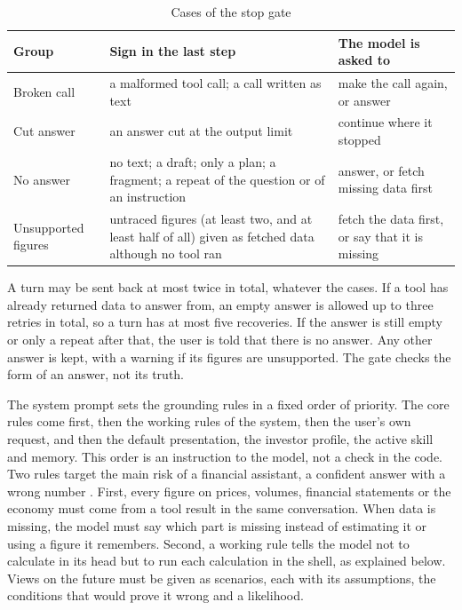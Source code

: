 \begin{table}[H]
  \centering
  \caption{Cases of the stop gate}\label{tab:stop-gate}
  \begin{tabularx}{\textwidth}{@{}l L L@{}}
    \toprule
    {Group} & {Sign in the last step} & {The model is asked to}\\
    \midrule
    Broken call & a malformed tool call; a call written as text & make the call again, or answer\\
    \addlinespace[2pt]
    Cut answer & an answer cut at the output limit & continue where it stopped\\
    \addlinespace[2pt]
    No answer & no text; a draft; only a plan; a fragment; a repeat of the question or of an instruction & answer, or fetch missing data first\\
    \addlinespace[2pt]
    Unsupported figures & untraced figures (at least two, and at least half of all) given as fetched data although no tool ran & fetch the data first, or say that it is missing\\
    \bottomrule
  \end{tabularx}
\end{table}

A turn may be sent back at most twice in total, whatever the cases.
If a tool has already returned data to answer from, an empty answer is allowed up to three retries in total, so a turn has at most five recoveries.
If the answer is still empty or only a repeat after that, the user is told that there is no answer.
Any other answer is kept, with a warning if its figures are unsupported.
The gate checks the form of an answer, not its truth.

\label{sec:grounding-rules}
The system prompt sets the grounding rules in a fixed order of priority.
The core rules come first, then the working rules of the system, then the user's own request, and then the default presentation, the investor profile, the active skill and memory.
This order is an instruction to the model, not a check in the code.
Two rules target the main risk of a financial assistant, a confident answer with a wrong number \parencite{kang2023deficiency}.
First, every figure on prices, volumes, financial statements or the economy must come from a tool result in the same conversation.
When data is missing, the model must say which part is missing instead of estimating it or using a figure it remembers.
Second, a working rule tells the model not to calculate in its head but to run each calculation in the shell, as explained below.
Views on the future must be given as scenarios, each with its assumptions, the conditions that would prove it wrong and a likelihood.


